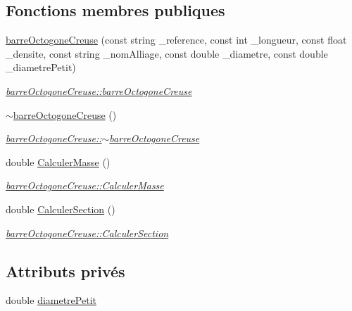\subsection*{Fonctions membres publiques}
\begin{DoxyCompactItemize}
\item 
\hyperlink{classbarre_octogone_creuse_a87882baf89e869f37c32d1cd27d62f43}{barre\+Octogone\+Creuse} (const string \+\_\+reference, const int \+\_\+longueur, const float \+\_\+densite, const string \+\_\+nom\+Alliage, const double \+\_\+diametre, const double \+\_\+diametre\+Petit)
\begin{DoxyCompactList}\small\item\em \hyperlink{classbarre_octogone_creuse_a87882baf89e869f37c32d1cd27d62f43}{barre\+Octogone\+Creuse\+::barre\+Octogone\+Creuse} \end{DoxyCompactList}\item 
\hyperlink{classbarre_octogone_creuse_aa93c0a16e1ccbcabb788f4c93ab7e7c9}{$\sim$barre\+Octogone\+Creuse} ()
\begin{DoxyCompactList}\small\item\em \hyperlink{classbarre_octogone_creuse_aa93c0a16e1ccbcabb788f4c93ab7e7c9}{barre\+Octogone\+Creuse\+::$\sim$barre\+Octogone\+Creuse} \end{DoxyCompactList}\item 
double \hyperlink{classbarre_octogone_creuse_a301de4f326c5e74317f640663f0dffc2}{Calculer\+Masse} ()
\begin{DoxyCompactList}\small\item\em \hyperlink{classbarre_octogone_creuse_a301de4f326c5e74317f640663f0dffc2}{barre\+Octogone\+Creuse\+::\+Calculer\+Masse} \end{DoxyCompactList}\item 
double \hyperlink{classbarre_octogone_creuse_a271dcf37a8794ec979ab82f87f99e218}{Calculer\+Section} ()
\begin{DoxyCompactList}\small\item\em \hyperlink{classbarre_octogone_creuse_a271dcf37a8794ec979ab82f87f99e218}{barre\+Octogone\+Creuse\+::\+Calculer\+Section} \end{DoxyCompactList}\end{DoxyCompactItemize}
\subsection*{Attributs privés}
\begin{DoxyCompactItemize}
\item 
double \hyperlink{classbarre_octogone_creuse_a6ce90d417e09ed69d6d4243e8bff355a}{diametre\+Petit}
\end{DoxyCompactItemize}
